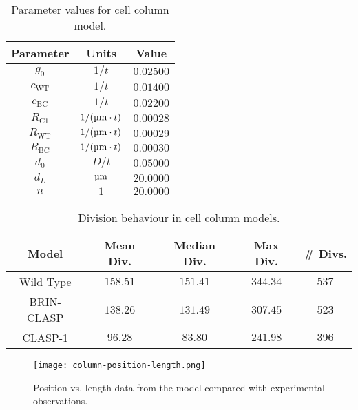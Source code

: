 \begin{table}
    \begin{center}
        \begin{tabular}{ |c|c|c| }
        \hline
         Parameter & Units & Value \\
         \hline
         $g_{0}$ & $1/t$ & $0.02500$ \\ 
         $c_{\text{WT}}$ & $1/t$ & $0.01400$ \\ 
         $c_{\text{BC}}$ & $1/t$ & $0.02200$ \\ 
         $R_{\text{C1}}$ & $1/(\um \cdot t)$ & $0.00028$ \\ 
         $R_{\text{WT}}$ & $1/(\um \cdot t)$ & $0.00029$ \\ 
         $R_{\text{BC}}$ & $1/(\um \cdot t)$ & $0.00030$ \\ 
         $d_{0}$ & $D/t$ & $0.05000$ \\ 
         $d_{L}$ & $\um$ & $20.0000$ \\ 
         $n$ & $1$ & $20.0000$ \\ 
         \hline
        \end{tabular}
    \caption{Parameter values for cell column model.}
    \label{tab:cell-column-parameters}
    \end{center}
\end{table}

\begin{table}
    \begin{center}
        \begin{tabular}{ |c|c|c|c|c| } 
        \hline
        Model & Mean Div. & Median Div. & Max Div. & \# Divs.  \\
        \hline
        Wild Type & $158.51$ & $151.41$ & $344.34$ & $537$  \\
        BRIN-CLASP & $138.26$ & $131.49$ & $307.45$ & $523$  \\
        CLASP-1 & $96.28$ & $83.80$ & $241.98$ & $396$  \\
        \hline
        \end{tabular}
    \caption{Division behaviour in cell column models.}
    \label{tab:cell-column-divisions}
    \end{center}
\end{table}

\medskip

\begin{figure}
    \centering
    \texttt{[image: column-position-length.png]}
    \caption{Position vs. length data from the model compared with experimental observations.}
    \label{fig:column-position-length}
\end{figure}

